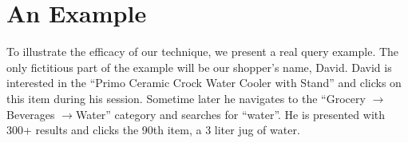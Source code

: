 \documentclass{article}
\begin{document}
\section{An Example}





To illustrate the efficacy of our technique, we present a real query example.
The only fictitious part of the example will be our shopper's name, David.
David is interested in the ``Primo Ceramic Crock Water Cooler with Stand'' and
clicks on this item during his session. Sometime later he navigates to the
``Grocery $\rightarrow $Beverages $\rightarrow $Water'' category and searches
for ``water''. He is presented with 300+ results and clicks the 90th item, a 3 liter
jug of water.
\end{document}
